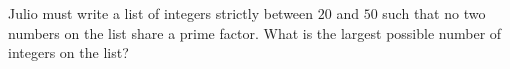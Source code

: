 Julio must write a list of integers strictly between $20$ and $50$ such that no two numbers on the list share a prime factor. What is the largest possible number of integers on the list?
